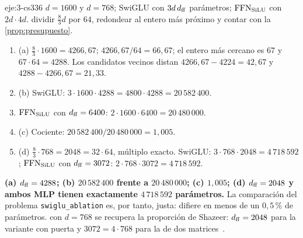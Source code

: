 \begin{solucion}{eje:3-cs336}
\datos $d=1600$ y $d=768$; SwiGLU con $3d\,d_{\mathrm{ff}}$ parámetros; $\operatorname{FFN}_{\operatorname{SiLU}}$ con $2d\cdot 4d$.
\planteamiento dividir $\frac83 d$ por $64$, redondear al entero más próximo y contar con la \cref{prop:presupuesto}.
\pasos
\begin{enumerate}[label=\arabic*.]
  \item (a) $\frac83\cdot 1600=4266{,}67$; $4266{,}67/64=66{,}67$; el entero más cercano es $67$ y $67\cdot 64=4288$. Los candidatos vecinos distan $4266{,}67-4224=42{,}67$ y $4288-4266{,}67=21{,}33$.
  \item (b) SwiGLU: $3\cdot 1600\cdot 4288=4800\cdot 4288=20\,582\,400$.
  \item $\operatorname{FFN}_{\operatorname{SiLU}}$ con $d_{\mathrm{ff}}=6400$: $2\cdot 1600\cdot 6400=20\,480\,000$.
  \item (c) Cociente: $20\,582\,400/20\,480\,000=1{,}005$.
  \item (d) $\frac83\cdot 768=2048=32\cdot 64$, múltiplo exacto. SwiGLU: $3\cdot 768\cdot 2048=4\,718\,592$; $\operatorname{FFN}_{\operatorname{SiLU}}$ con $d_{\mathrm{ff}}=3072$: $2\cdot 768\cdot 3072=4\,718\,592$.
\end{enumerate}
\resultado \textbf{(a) $d_{\mathrm{ff}}=4288$; (b) $20\,582\,400$ frente a $20\,480\,000$; (c) $1{,}005$; (d) $d_{\mathrm{ff}}=2048$ y ambos MLP tienen exactamente $4\,718\,592$ parámetros.} La comparación del problema \texttt{swiglu\_ablation} es, por tanto, justa: difiere en menos de un $0{,}5\,\%$ de parámetros.
\comprobacion con $d=768$ se recupera la proporción de Shazeer: $d_{\mathrm{ff}}=2048$ para la variante con puerta y $3072=4\cdot 768$ para la de dos matrices~\cite[§3.1]{shazeer}.
\end{solucion}

